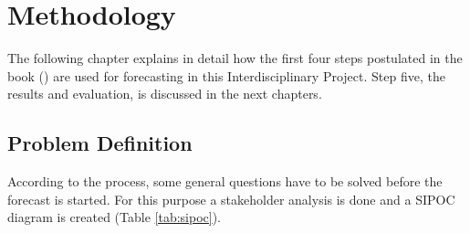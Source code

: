 \chapter{Methodology}\label{chapter:Methodology}
The following chapter explains in detail how the first four steps postulated in the book (\cite{Hyndman.2013}) are used for forecasting in this Interdisciplinary Project. Step five, the results and evaluation, is discussed in the next chapters.\newline
\section{Problem Definition}\label{section:Problem Definition}
According to the process, some general questions have to be solved before the forecast is started. For this purpose a stakeholder analysis is done and a SIPOC diagram is created (Table \ref{tab:sipoc}).

